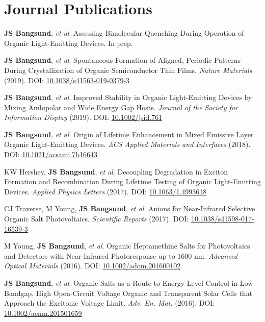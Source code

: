 \documentclass{article}
\newcommand{\headspace}{\vspace{0.8em}} %
\renewenvironment{itemize}[1]{\begin{compactitem}#1}{\end{compactitem}}
\begin{document}
\section{Journal Publications}
\headspace
\begin{itemize}[1]
\item[8] \textbf{JS Bangsund}, {\em et al}. Assessing Bimolecular Quenching During Operation of Organic Light-Emitting Devices. In prep.
\item[7] \textbf{JS Bangsund}, {\em et al}. Spontaneous Formation of Aligned, Periodic Patterns During Crystallization of Organic Semiconductor Thin Films. {\em Nature Materials} (2019). DOI:  \href{https://doi.org/10.1038/s41563-019-0379-3}{10.1038/s41563-019-0379-3}
\item[6] \textbf{JS Bangsund}, {\em et al}. Improved Stability in Organic Light-Emitting Devices by Mixing Ambipolar and Wide Energy Gap Hosts. {\em Journal of the Society for Information Display} (2019). DOI:  \href{https://doi.org/10.1002/jsid.761}{10.1002/jsid.761}
\item[5] \textbf{JS Bangsund}, {\em et al}. Origin of Lifetime Enhancement in Mixed Emissive Layer Organic Light-Emitting Devices. {\em ACS Applied Materials and Interfaces} (2018). DOI:  \href{https://doi.org/10.1021/acsami.7b16643}{10.1021/acsami.7b16643}
\item[4]  KW Hershey, \textbf{JS Bangsund}, {\em et al}. Decoupling Degradation in Exciton Formation and Recombination During Lifetime Testing of Organic Light-Emitting Devices. {\em Applied Physics Letters} (2017). DOI:  \href{https://doi.org/10.1063/1.4993618}{10.1063/1.4993618}
\item[3] CJ Traverse, M Young, \textbf{JS Bangsund}, {\em et al}. Anions for Near-Infrared Selective Organic Salt Photovoltaics. {\em Scientific Reports} (2017).  DOI:  \href{https://doi.org/10.1038/s41598-017-16539-3}{10.1038/s41598-017-16539-3}
\item[2] M Young, \textbf{JS Bangsund}, {\em et al}. Organic Heptamethine Salts for Photovoltaics and Detectors with Near-Infrared Photoresponse up to 1600 nm. {\em Advanced Optical Materials} (2016). DOI:  \href{https://doi.org/10.1002/adom.201600102}{10.1002/adom.201600102}
\item[1] \textbf{JS Bangsund}, {\em et al}. Organic Salts as a Route to Energy Level Control in Low Bandgap, High Open-Circuit Voltage Organic and Transparent Solar Cells that Approach the Excitonic Voltage Limit. {\em Adv. En. Mat.} (2016). DOI:  \href{https://doi.org/10.1002/aenm.201501659}{10.1002/aenm.201501659}
\end{itemize}
\end{document}
